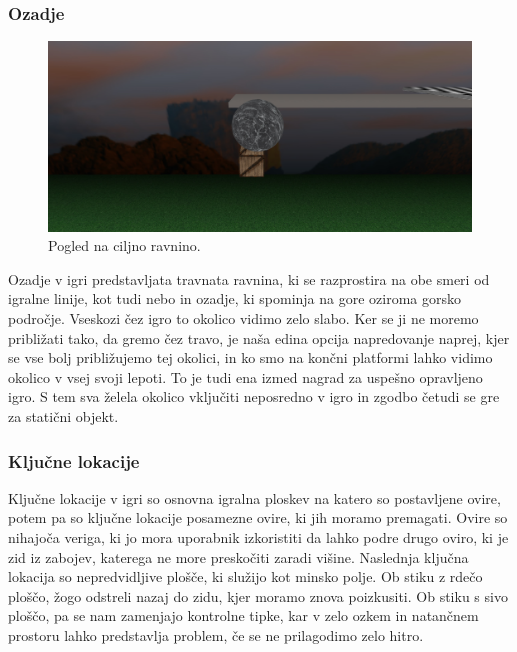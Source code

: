 \documentclass[a4paper]{article}
\begin{document}
\subsubsection{Ozadje}
\begin{figure}[!htb]
    \begin{center}
        \includegraphics[width=\columnwidth]{finish.jpg}
        \caption{Pogled na ciljno ravnino.} \label{fig:konec}
    \end{center}
\end{figure}
Ozadje v igri predstavljata travnata ravnina, ki se razprostira na obe smeri od igralne linije, kot tudi nebo in ozadje, ki spominja na gore oziroma gorsko področje. Vseskozi čez igro to okolico vidimo zelo slabo. Ker se ji ne moremo približati tako, da gremo čez travo, je naša edina opcija napredovanje naprej, kjer se vse bolj približujemo tej okolici, in ko smo na končni platformi lahko vidimo okolico v vsej svoji lepoti. To je tudi ena izmed nagrad za uspešno opravljeno igro. S tem sva želela okolico vključiti neposredno v igro in zgodbo četudi se gre za statični objekt.

\subsubsection{Ključne lokacije}
Ključne lokacije v igri so osnovna igralna ploskev na katero so postavljene ovire, potem pa so ključne lokacije posamezne ovire, ki jih moramo premagati. Ovire so nihajoča veriga, ki jo mora uporabnik izkoristiti da lahko podre drugo oviro, ki je zid iz zabojev, katerega ne more preskočiti zaradi višine. Naslednja ključna lokacija so nepredvidljive plošče, ki služijo kot minsko polje. Ob stiku z rdečo ploščo, žogo odstreli nazaj do zidu, kjer moramo znova poizkusiti. Ob stiku s sivo ploščo, pa se nam zamenjajo kontrolne tipke, kar v zelo ozkem in natančnem prostoru lahko predstavlja problem, če se ne prilagodimo zelo hitro. 
\end{document}
